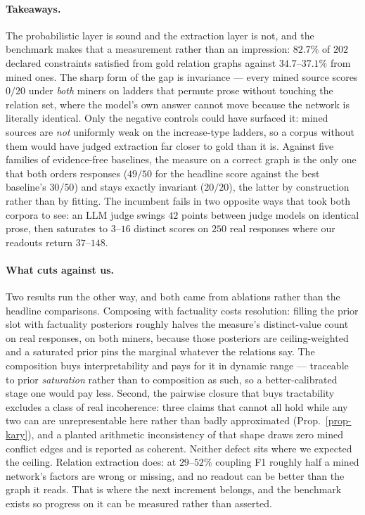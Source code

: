 \paragraph{Takeaways.} The probabilistic layer is sound and the extraction layer is not, and the benchmark makes
that a measurement rather than an impression: $82.7\%$ of $202$ declared constraints satisfied from gold relation
graphs against $34.7$--$37.1\%$ from mined ones. The sharp form of the gap is invariance --- every mined source
scores $0/20$ under \emph{both} miners on ladders that permute prose without touching the relation set, where the
model's own answer cannot move because the network is literally identical. Only the negative controls could have
surfaced it: mined sources are \emph{not} uniformly weak on the increase-type ladders, so a corpus without them
would have judged extraction far closer to gold than it is. Against five families of evidence-free baselines, the
measure on a correct graph is the only one that both orders responses ($49/50$ for the headline score against
the best baseline's $30/50$) and stays exactly invariant ($20/20$), the latter by construction rather than by fitting. The incumbent
fails in two opposite ways that took both corpora to see: an LLM judge swings $42$ points between judge models on
identical prose, then saturates to $3$--$16$ distinct scores on $250$ real responses where our readouts return
$37$--$148$.

\paragraph{What cuts against us.} Two results run the other way, and both came from ablations rather than the
headline comparisons. Composing with factuality costs resolution: filling the prior slot with factuality
posteriors roughly halves the measure's distinct-value count on real responses, on both miners, because those
posteriors are ceiling-weighted and a saturated prior pins the marginal whatever the relations say. The
composition buys interpretability and pays for it in dynamic range --- traceable to prior \emph{saturation}
rather than to composition as such, so a better-calibrated stage one would pay less. Second, the pairwise closure
that buys tractability excludes a class of real incoherence: three claims that cannot all hold while any two can
are unrepresentable here rather than badly approximated (Prop.~\ref{prop-kary}), and a planted arithmetic
inconsistency of that shape draws zero mined conflict edges and is reported as coherent. Neither defect sits
where we expected the ceiling. Relation extraction does: at $29$--$52\%$ coupling F1 roughly half a mined
network's factors are wrong or missing, and no readout can be better than the graph it reads. That is where the
next increment belongs, and the benchmark exists so progress on it can be measured rather than asserted.


